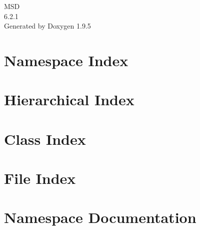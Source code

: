 \documentclass[twoside]{book}
\newcommand{\+}{\discretionary{\mbox{\scriptsize$\hookleftarrow$}}{}{}}
\newcommand{\clearemptydoublepage}{%
    \newpage{\pagestyle{empty}\cleardoublepage}%
  }
\begin{document}
  \raggedbottom
    \hypersetup{pageanchor=false,
                bookmarksnumbered=true,
                pdfencoding=unicode
               }
  \begin{titlepage}
  \vspace*{7cm}
  \begin{center}%
  {\Large MSD}\\
  [1ex]\large 6.\+2.\+1 \\
  \vspace*{1cm}
  {\large Generated by Doxygen 1.9.5}\\
  \end{center}
  \end{titlepage}
  \clearemptydoublepage
  \tableofcontents
  \clearemptydoublepage
  \hypersetup{pageanchor=true}
\chapter{Namespace Index}

\chapter{Hierarchical Index}

\chapter{Class Index}

\chapter{File Index}

\chapter{Namespace Documentation}


\end{document}
